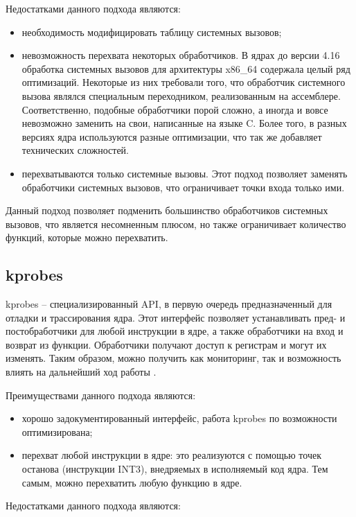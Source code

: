 Недостатками данного подхода являются:

\begin{itemize}
	\item необходимость модифицировать таблицу системных вызовов;
	\item невозможность перехвата некоторых обработчиков. В ядрах до версии 4.16 обработка системных вызовов для архитектуры x86\_64 содержала целый ряд оптимизаций. Некоторые из них требовали того, что обработчик системного вызова являлся специальным переходником, реализованным на ассемблере. Соответственно, подобные обработчики порой сложно, а иногда и вовсе невозможно заменить на свои, написанные на языке C. Более того, в разных версиях ядра используются разные оптимизации, что так же добавляет технических сложностей.
	\item перехватываются только системные вызовы. Этот подход позволяет заменять обработчики системных вызовов, что ограничивает точки входа только ими. 
\end{itemize}

Данный подход позволяет подменить большинство обработчиков системных вызовов, что является несомненным плюсом, но также ограничивает количество функций, которые можно перехватить.

\subsection{kprobes}

kprobes -- специализированный API, в первую очередь предназначенный для отладки и трассирования ядра. Этот интерфейс позволяет устанавливать пред- и постобработчики для любой инструкции в ядре, а также обработчики на вход и возврат из функции. Обработчики получают доступ к регистрам и могут их изменять. Таким образом, можно получить как мониторинг, так и возможность влиять на дальнейший ход работы \cite{tras_ftrace}.

Преимуществами данного подхода являются:

\begin{itemize}
	\item хорошо задокументированный интерфейс, работа kprobes по возможности оптимизирована;
	\item перехват любой инструкции в ядре: это реализуются с помощью точек останова (инструкции INT3), внедряемых в исполняемый код ядра. Тем самым, можно перехватить любую функцию в ядре.
\end{itemize}

Недостатками данного подхода являются:

